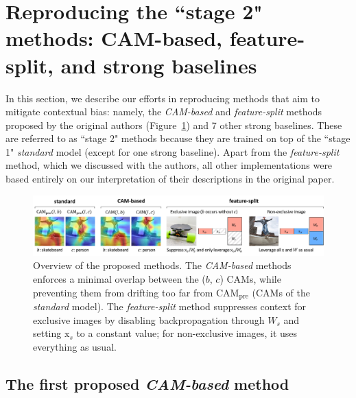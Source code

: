 
\section{Reproducing the ``stage 2" methods: CAM-based, feature-split, and strong baselines} \label{sec:stage2}

In this section, we describe our efforts in reproducing methods that aim to mitigate contextual bias: namely, the \emph{CAM-based} and \emph{feature-split} methods proposed by the original authors  (Figure~\ref{fig:overview}) and 7 other strong baselines. These are referred to as ``stage 2" methods because they are trained on top of the ``stage 1" \emph{standard} model (except for one strong baseline). Apart from the \emph{feature-split} method, which we discussed with the authors, all other implementations were based entirely on our interpretation of their descriptions in the original paper.

\begin{figure}[h!]
    \centering
    \includegraphics[width=1.0\linewidth]{../openreview/images/algorithms_final.pdf}
    \caption{Overview of the proposed methods. The \emph{CAM-based} methods enforces a minimal overlap between the ($b$, $c$) CAMs, while preventing them from drifting too far from CAM$_{\text{pre}}$ (CAMs of the \emph{standard} model). The \emph{feature-split} method suppresses context for exclusive images by disabling backpropagation through $W_s$ and setting $\mathrm{x}_s$ to a constant value; for non-exclusive images, it uses everything as usual.}
    \label{fig:overview}
\end{figure}


\subsection{The first proposed \textit{CAM-based} method} \label{sec:cam}

